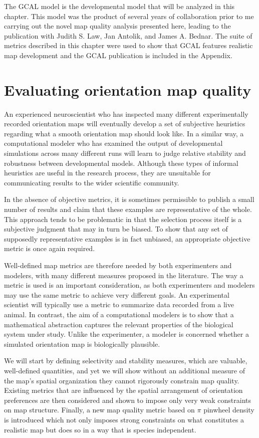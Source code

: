 \documentclass[phd,ianc,twoside]{infthesis}
\begin{document}
The GCAL model \citep{stevens_jn13} is the developmental model that will
be analyzed in this chapter. This model was the product of several years of
collaboration prior to me carrying out the novel map quality analysis presented
here, leading to the publication with Judith S. Law, Jan Antolik, and
James A. Bednar. The suite of metrics described in this chapter were
used to show that GCAL features realistic map development and the GCAL
publication is included in the Appendix.

\section{Evaluating orientation map quality}

An experienced neuroscientist who has inspected many different
experimentally recorded orientation maps will eventually develop a set
of subjective heuristics regarding what a smooth orientation map should
look like. In a similar way, a computational modeler who has examined
the output of developmental simulations across many different runs will
learn to judge relative stability and robustness between developmental
models. Although these types of informal heuristics are useful in the
research process, they are unsuitable for communicating results to the
wider scientific community.

In the absence of objective metrics, it is sometimes permissible to
publish a small number of results and claim that these examples are
representative of the whole. This approach tends to be problematic in
that the selection process itself is a subjective judgment that may in
turn be biased. To show that any set of supposedly representative
examples is in fact unbiased, an appropriate objective metric is once
again required.

Well-defined map metrics are therefore needed by both experimenters
and modelers, with many different measures proposed in the
literature. The way a metric is used is an important consideration, as
both experimenters and modelers may use the same metric to achieve
very different goals. An experimental scientist will typically use a
metric to summarize data recorded from a live animal. In contrast, the
aim of a computational modelers is to show that a mathematical
abstraction captures the relevant properties of the biological system
under study. Unlike the experimenter, a modeler is concerned whether
a simulated orientation map is biologically plausible.

We will start by defining selectivity and stability measures, which are
valuable, well-defined quantities, and yet we will show without an additional
measure of the map's spatial organization they cannot rigorously
constrain map quality. Existing metrics that are influenced by the
spatial arrangement of orientation preferences are then considered and
shown to impose only very weak constraints on map structure. Finally, a new
map quality metric based on $\pi$ pinwheel density is introduced which
not only imposes strong constraints on what constitutes a realistic map
but does so in a way that is species independent.
\end{document}
